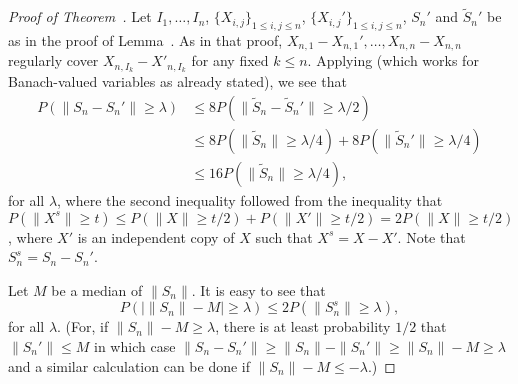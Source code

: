 \documentclass[12pt]{amsart}
\def\upref#1{\upn{\ref{#1}}}
\theoremstyle{definition}
\theoremstyle{plain}
\theoremstyle{remark}
\begin{document}
\begin{proof}[Proof of Theorem~\upref{th:main}]
Let $I_1,\dots,I_n$, $\{ X_{i,j} \}_{1\le i,j\le n}$, $\{
X_{i,j}' \}_{1\le i,j\le n}$, $S_n'$ and $\tilde S_n'$ be as in the
proof of Lemma~\upref{lem:comp-moment}.
As in that proof, $X_{n,1}-X_{n,1}',\dots,X_{n,n}-X_{n,n}$ regularly
cover $X_{n,I_k}-X'_{n,I_k}$ for any fixed $k\le n$.
Applying
\cite[Proposition~1]{Pruss:noniid} (which works for
Banach-valued variables as already stated), we see that
\begin{equation}\label{eq:first-ineq}
\begin{split}
   P(\| S_n-S_n' \|\ge \lambda) 
   &\le 8P(\| \tilde S_n-\tilde S_n' \| \ge
   \lambda/2) \\
   &\le 8P(\| \tilde S_n \| \ge \lambda/4) 
        + 8P(\| \tilde S_n' \| \ge \lambda/4) \\
   &\le 16P(\| \tilde S_n \| \ge \lambda/4),
\end{split}
\end{equation}
for all $\lambda$,
where the second inequality followed from the
inequality that $P(\|X^s\|\ge t)\le P(\|X\|\ge t/2)+P(\|X'\|\ge
t/2)=2P(\|X\|\ge
t/2)$, where $X'$ is an independent copy of $X$ such that $X^s=X-X'$.
Note that $S_n^s=S_n-S_n'$.

Let $M$ be a median of $\| S_n \|$.  It is easy to see that
\begin{equation}\label{eq:second-ineq}
        P(| \|S_n\|-M |\ge\lambda)\le 2P(\|S_n^s\|\ge\lambda),
\end{equation}
for all $\lambda$.  (For, if $\| S_n \|-M\ge\lambda$, there is at least
probability $1/2$ that $\| S_n' \|\le M$ in which case $\| S_n -S_n'\|
\ge \| S_n \|-\|S_n'\| \ge \|S_n \|-M\ge\lambda$ and a similar
calculation can be done if $\| S_n \|-M\le -\lambda$.)


\end{proof}
\end{document}
